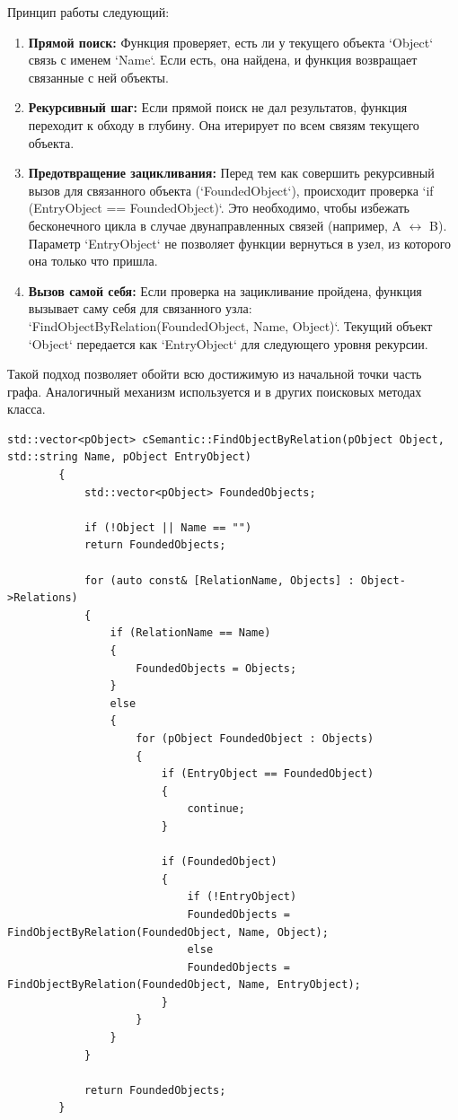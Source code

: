 \documentclass[12pt,a4paper]{scrartcl}
\begin{document}
	Принцип работы следующий:
	\begin{enumerate}
		\item \textbf{Прямой поиск:} Функция проверяет, есть ли у текущего объекта `Object` связь с именем `Name`. Если есть, она найдена, и функция возвращает связанные с ней объекты.
		\item \textbf{Рекурсивный шаг:} Если прямой поиск не дал результатов, функция переходит к обходу в глубину. Она итерирует по всем связям текущего объекта.
		\item \textbf{Предотвращение зацикливания:} Перед тем как совершить рекурсивный вызов для связанного объекта (`FoundedObject`), происходит проверка `if (EntryObject == FoundedObject)`. Это необходимо, чтобы избежать бесконечного цикла в случае двунаправленных связей (например, A $\leftrightarrow$ B). Параметр `EntryObject` не позволяет функции вернуться в узел, из которого она только что пришла.
		\item \textbf{Вызов самой себя:} Если проверка на зацикливание пройдена, функция вызывает саму себя для связанного узла: `FindObjectByRelation(FoundedObject, Name, Object)`. Текущий объект `Object` передается как `EntryObject` для следующего уровня рекурсии.
	\end{enumerate}
	Такой подход позволяет обойти всю достижимую из начальной точки часть графа. Аналогичный механизм используется и в других поисковых методах класса.
	
	\begin{lstlisting}[caption={Рекурсивный поиск объекта по связи}]
		std::vector<pObject> cSemantic::FindObjectByRelation(pObject Object, std::string Name, pObject EntryObject)
		{
			std::vector<pObject> FoundedObjects;
			
			if (!Object || Name == "")
			return FoundedObjects;
			
			for (auto const& [RelationName, Objects] : Object->Relations)
			{
				if (RelationName == Name)
				{
					FoundedObjects = Objects;
				}
				else
				{
					for (pObject FoundedObject : Objects)
					{
						if (EntryObject == FoundedObject)
						{
							continue;
						}
						
						if (FoundedObject)
						{
							if (!EntryObject)
							FoundedObjects = FindObjectByRelation(FoundedObject, Name, Object);
							else
							FoundedObjects = FindObjectByRelation(FoundedObject, Name, EntryObject);
						}
					}
				}
			}
			
			return FoundedObjects;
		}
	\end{lstlisting}
	
\end{document}
